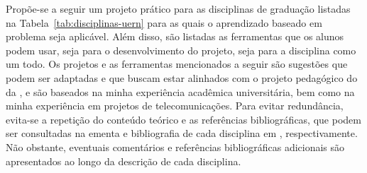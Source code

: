 \documentclass{article}
\begin{document}
Propõe-se a seguir um projeto prático para as disciplinas de graduação listadas na Tabela~\ref{tab:disciplinas-uern} para as quais o aprendizado baseado em problema seja aplicável. Além disso, são listadas as ferramentas que os alunos podem usar, seja para o desenvolvimento do projeto, seja para a disciplina como um todo. Os projetos e as ferramentas mencionados a seguir são sugestões que podem ser adaptadas e que buscam estar alinhados com o projeto pedagógico do  da  \cite{ufrn_ppc_telecom_2024}, e são baseados na minha experiência acadêmica universitária, bem como na minha experiência em projetos de telecomunicações. Para evitar redundância, evita-se a repetição do conteúdo teórico e as referências bibliográficas, que podem ser consultadas na ementa e bibliografia de cada disciplina em \cite{ufrn_ppc_telecom_2024}, respectivamente. Não obstante, eventuais comentários e referências bibliográficas adicionais são apresentados ao longo da descrição de cada disciplina.
\end{document}
